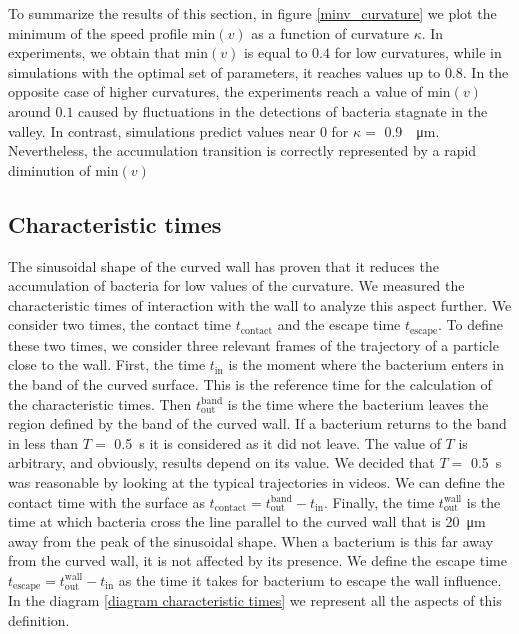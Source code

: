 To summarize the results of this section, in figure \ref{minv_curvature} we plot the minimum of the speed profile $\text{min}(v)$ as a function of curvature $\kappa$. In experiments, we obtain that $\text{min}(v)$ is equal to $0.4$ for low curvatures, while in simulations with the optimal set of parameters, it reaches values up to $0.8$. In the opposite case of higher curvatures, the experiments reach a value of $\text{min}(v)$ around $0.1$ caused by fluctuations in the detections of bacteria stagnate in the valley. In contrast, simulations predict values near $0$ for $\kappa=$ \SI{0.9}{\per\micro\meter}. Nevertheless, the accumulation transition is correctly represented by a rapid diminution of $\text{min}(v)$ 


\label{section: times}
\subsection{Characteristic times}


The sinusoidal shape of the curved wall has proven that it reduces the accumulation of bacteria for low values of the curvature. We measured the characteristic times of interaction with the wall to analyze this aspect further. We consider two times, the contact time $t_{\text{contact}}$ and the escape time $t_{\text{escape}}$. To define these two times, we consider three relevant frames of the trajectory of a particle close to the wall. First, the time $t_{\text{in}}$ is the moment where the bacterium enters in the band of the curved surface. This is the reference time for the calculation of the characteristic times. Then $t_{\text{out}}^{\text{band}}$ is the time where the bacterium leaves the region defined by the band of the curved wall. If a bacterium returns to the band in less than $T=$ \SI{0.5}{\second} it is considered as it did not leave. The value of $T$ is arbitrary, and obviously, results depend on its value. We decided that $T=$ \SI{0.5}{\second} was reasonable by looking at the typical trajectories in videos. We can define the contact time with the surface as $t_{\text{contact}} = t_{\text{out}}^{\text{band}} - t_{\text{in}} $. Finally, the time  $t_{\text{out}}^{\text{wall}}$ is the time at which bacteria cross the line parallel to the curved wall that is \SI{20}{\micro\meter} away from the peak of the sinusoidal shape. When a bacterium is this far away from the curved wall, it is not affected by its presence. We define the escape time  $t_{\text{escape}} = t_{\text{out}}^{\text{wall}} - t_{\text{in}} $ as the time it takes for bacterium to escape the wall influence. In the diagram \ref{diagram characteristic times} we represent all the aspects of this definition.


